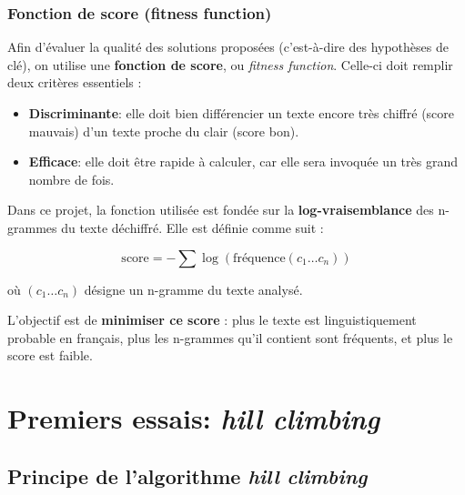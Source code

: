 \documentclass[a4paper]{article}
\begin{document}
\subsubsection{Fonction de score (fitness function)}

Afin d’évaluer la qualité des solutions proposées (c’est-à-dire des hypothèses de clé), on utilise une \textbf{fonction de score}, ou \textit{fitness function}. Celle-ci doit remplir deux critères essentiels :

\begin{itemize}
    \item \textbf{Discriminante}: elle doit bien différencier un texte encore très chiffré (score mauvais) d’un texte proche du clair (score bon).
    \item \textbf{Efficace}: elle doit être rapide à calculer, car elle sera invoquée un très grand nombre de fois.
\end{itemize}

Dans ce projet, la fonction utilisée est fondée sur la \textbf{log-vraisemblance} des n-grammes du texte déchiffré. Elle est définie comme suit :

\[
\text{score} = - \sum \log\left(\text{fréquence}(c_1 \ldots c_n)\right)
\]

où $(c_1 \ldots c_n)$ désigne un n-gramme du texte analysé.

L’objectif est de \textbf{minimiser ce score} : plus le texte est linguistiquement probable en français, plus les n-grammes qu’il contient sont fréquents, et plus le score est faible.


\section{Premiers essais: \textit{hill climbing}}

\subsection{Principe de l’algorithme \textit{hill climbing}}
\end{document}
